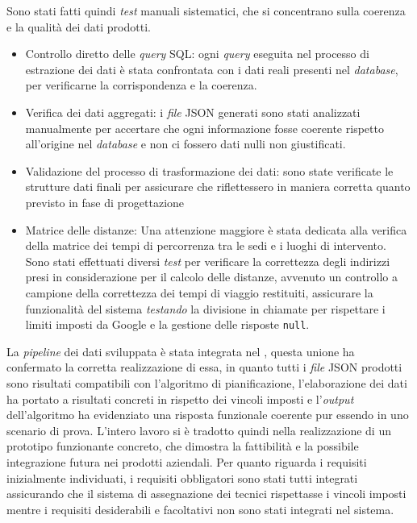 Sono stati fatti quindi \textit{test} manuali sistematici, che si concentrano sulla coerenza e la qualità dei dati prodotti. 
\begin{itemize}
    \item Controllo diretto delle \textit{query} SQL: ogni \textit{query} eseguita nel processo di estrazione dei dati è stata confrontata con i dati reali presenti nel \textit{database}, per verificarne la corrispondenza e la coerenza.
    \item Verifica dei dati aggregati: i \textit{file} JSON generati sono stati analizzati manualmente per accertare che ogni informazione fosse coerente rispetto all'origine nel \textit{database} e non ci fossero dati nulli non giustificati.
    \item Validazione del processo di trasformazione dei dati: sono state verificate le strutture dati finali per assicurare che riflettessero in maniera corretta quanto previsto in fase di progettazione
    \item Matrice delle distanze: Una attenzione maggiore è stata dedicata alla verifica della matrice dei tempi di percorrenza tra le sedi e i luoghi di intervento. Sono stati effettuati diversi \textit{test} per verificare la correttezza degli indirizzi presi in considerazione per il calcolo delle distanze, avvenuto un controllo a campione della correttezza dei tempi di viaggio restituiti, assicurare la funzionalità del sistema \textit{testando} la divisione in chiamate per rispettare i limiti imposti da Google e la gestione delle risposte \texttt{null}.
\end{itemize}


La \textit{pipeline} dei dati sviluppata è stata integrata nel , questa unione ha confermato la corretta realizzazione di essa, in quanto tutti i \textit{file} JSON prodotti sono risultati compatibili con l'algoritmo di pianificazione, l'elaborazione dei dati ha portato a risultati concreti in rispetto dei vincoli imposti e l'\textit{output} dell'algoritmo ha evidenziato una risposta funzionale coerente pur essendo in uno scenario di prova.
L'intero lavoro si è tradotto quindi nella realizzazione di un prototipo funzionante concreto, che dimostra la fattibilità e la possibile integrazione futura nei prodotti aziendali. Per quanto riguarda i requisiti inizialmente individuati, i requisiti obbligatori sono stati tutti integrati assicurando che il sistema di assegnazione dei tecnici rispettasse i vincoli imposti mentre i requisiti desiderabili e facoltativi non sono stati integrati nel sistema.
\newpage